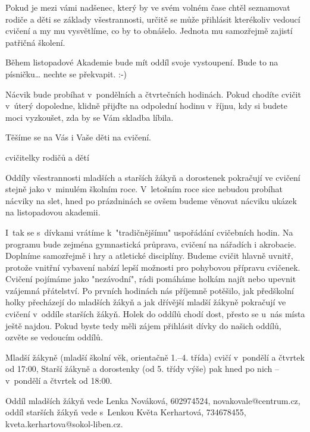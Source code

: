 \documentclass[11pt]{article}
\begin{document}
Pokud je mezi vámi nadšenec, který by ve svém volném čase chtěl seznamovat rodiče a děti se základy všestrannosti, určitě se může přihlásit kterékoliv vedoucí cvičení a my mu vysvětlíme, co by to obnášelo. Jednota mu samozřejmě zajistí patřičná školení.

Během listopadové Akademie bude mít oddíl svoje vystoupení. Bude to na písničku… nechte se překvapit. :-)

Nácvik bude probíhat v~pondělních a čtvrtečních hodinách. Pokud chodíte cvičit v~úterý dopoledne, klidně přijďte na odpolední hodinu v~říjnu, kdy si budete moci vyzkoušet, zda by se Vám skladba líbila.

Těšíme se na Vás i Vaše děti na cvičení.

\signature{Jana, Dana a Jana}{cvičitelky rodičů a dětí}

\clearpage

Oddíly všestrannosti mladších a starších žákyň a dorostenek pokračují ve cvičení stejně jako v~minulém školním roce. V~letošním roce sice nebudou probíhat nácviky na slet, hned po prázdninách se ovšem budeme věnovat nácviku ukázek na listopadovou akademii.

I~tak se s~dívkami vrátíme k~"tradičnějšímu" uspořádání cvičebních hodin. Na programu bude zejména gymnastická průprava, cvičení na nářadích i akrobacie. Doplníme samozřejmě i hry a atletické disciplíny. Budeme cvičit hlavně uvnitř, protože vnitřní vybavení nabízí lepší možnosti pro pohybovou přípravu cvičenek. Cvičení pojímáme jako "nezávodní", rádi pomáháme holkám najít nebo upevnit vzájemná přátelství. Po prvních hodinách nás příjemně potěšilo, jak předškolní holky přecházejí do mladších žákyň a jak dřívější mladší žákyně pokračují ve cvičení v~oddíle starších žákyň. Holek do oddílů chodí dost, přesto se u~nás místa ještě najdou. Pokud byste tedy měli zájem přihlásit dívky do našich oddílů, ozvěte se vedoucím oddílů.
 
Mladší žákyně (mladší školní věk, orientačně 1.–⁠⁠⁠⁠⁠⁠4. třída) cvičí v~pondělí a čtvrtek od 17:00,
Starší žákyně a dorostenky (od 5. třídy výše) pak hned po nich –⁠⁠⁠⁠⁠⁠ v~pondělí a čtvrtek od 18:00.

Oddíl mladších žákyň vede Lenka Nováková, 602974524, novakovale@centrum.cz, oddíl starších žákyň vede s~Lenkou Květa Kerhartová, 734678455, kveta.kerhartova@sokol-liben.cz.

\signature{Lenka a Květa}{}
\vspace*{24pt}
\end{document}

